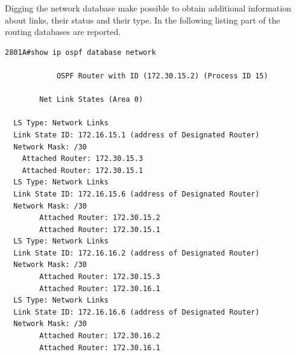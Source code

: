 \documentclass{llncs}
\begin{document}
Digging the network database make possible to obtain additional information about links, their status and their type. In the following listing part of the routing databases are reported.
\\
\lstset{language=sh, caption=Router Cisco 2801A network database,  basicstyle=\ttfamily\scriptsize , breaklines=true}
\begin{lstlisting}
2801A#show ip ospf database network 

            OSPF Router with ID (172.30.15.2) (Process ID 15)

		Net Link States (Area 0)

  LS Type: Network Links
  Link State ID: 172.16.15.1 (address of Designated Router)
  Network Mask: /30
	Attached Router: 172.30.15.3
	Attached Router: 172.30.15.1
  LS Type: Network Links
  Link State ID: 172.16.15.6 (address of Designated Router)
  Network Mask: /30
        Attached Router: 172.30.15.2
        Attached Router: 172.30.15.1
  LS Type: Network Links
  Link State ID: 172.16.16.2 (address of Designated Router)
  Network Mask: /30
        Attached Router: 172.30.15.3
        Attached Router: 172.30.16.1
  LS Type: Network Links
  Link State ID: 172.16.16.6 (address of Designated Router)
  Network Mask: /30
        Attached Router: 172.30.16.2
        Attached Router: 172.30.16.1
\end{lstlisting}
\lstset{language=sh, caption=Router Cisco 2801A database router,  basicstyle=\ttfamily\scriptsize , breaklines=true}
\end{document}
